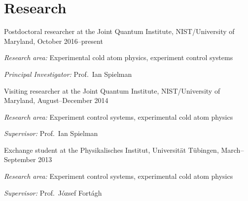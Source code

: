 \documentclass[10pt,a4paper]{article}
\renewenvironment{itemize}{
  \begin{list}{}{
    \setlength{\leftmargin}{1.5em}
    \setlength{\itemsep}{0.25em}
    \setlength{\parskip}{0pt}
    \setlength{\parsep}{0.25em}
  }
}{
  \end{list}
}
\begin{document}
\section*{Research}
\begin{itemize}

\item{Postdoctoral researcher at the Joint Quantum Institute, NIST/University of Maryland, October 2016--present}
    \begin{itemize}
      \item \textit{Research area:}
      Experimental cold atom physics, experiment control systems
      \item \textit{Principal Investigator:}
      Prof.~Ian Spielman
    \end{itemize}

\item{Visiting researcher at the Joint Quantum Institute, NIST/University of Maryland, August--December 2014}
    \begin{itemize}
      \item \textit{Research area:}
      Experiment control systems, experimental cold atom physics
      \item \textit{Supervisor:}
      Prof.~Ian Spielman
    \end{itemize}

\item{Exchange student at the Physikalisches Institut, Universität Tübingen, March–September 2013}
    \begin{itemize}
      \item \textit{Research area:}
      Experiment control systems, experimental cold atom physics
      \item \textit{Supervisor:}
      Prof.~József Fortágh
    \end{itemize}
    

\end{itemize}
\end{document}
